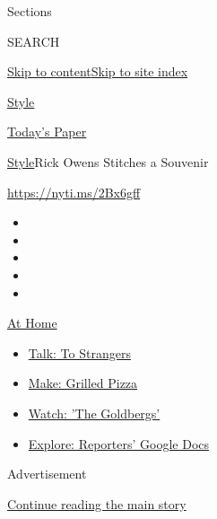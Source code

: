 Sections

SEARCH

\protect\hyperlink{site-content}{Skip to
content}\protect\hyperlink{site-index}{Skip to site index}

\href{https://www.nytimes.com/section/style}{Style}

\href{https://myaccount.nytimes.com/auth/login?response_type=cookie\&client_id=vi}{}

\href{https://www.nytimes.com/section/todayspaper}{Today's Paper}

\href{/section/style}{Style}\textbar{}Rick Owens Stitches a Souvenir

\url{https://nyti.ms/2Bx6gff}

\begin{itemize}
\item
\item
\item
\item
\item
\end{itemize}

\href{https://www.nytimes.com/spotlight/at-home?action=click\&pgtype=Article\&state=default\&region=TOP_BANNER\&context=at_home_menu}{At
Home}

\begin{itemize}
\tightlist
\item
  \href{https://www.nytimes.com/2020/08/03/well/family/the-benefits-of-talking-to-strangers.html?action=click\&pgtype=Article\&state=default\&region=TOP_BANNER\&context=at_home_menu}{Talk:
  To Strangers}
\item
  \href{https://www.nytimes.com/2020/08/01/at-home/coronavirus-make-pizza-on-a-grill.html?action=click\&pgtype=Article\&state=default\&region=TOP_BANNER\&context=at_home_menu}{Make:
  Grilled Pizza}
\item
  \href{https://www.nytimes.com/2020/07/31/arts/television/goldbergs-abc-stream.html?action=click\&pgtype=Article\&state=default\&region=TOP_BANNER\&context=at_home_menu}{Watch:
  'The Goldbergs'}
\item
  \href{https://www.nytimes.com/interactive/2020/at-home/even-more-reporters-editors-diaries-lists-recommendations.html?action=click\&pgtype=Article\&state=default\&region=TOP_BANNER\&context=at_home_menu}{Explore:
  Reporters' Google Docs}
\end{itemize}

Advertisement

\protect\hyperlink{after-top}{Continue reading the main story}


